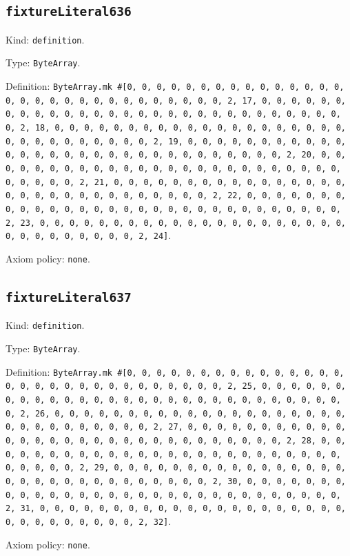 \documentclass[11pt]{article}
\begin{document}
\subsection*{\texttt{fixtureLiteral636}}
\noindent Kind: \texttt{definition}.\par
\noindent Type: \texttt{ByteArray}.\par
\noindent Definition: \texttt{ByteArray.mk \#[0, 0, 0, 0, 0, 0, 0, 0, 0, 0, 0, 0, 0, 0, 0, 0, 0, 0, 0, 0, 0, 0, 0, 0, 0, 0, 0, 0, 0, 0, 2, 17, 0, 0, 0, 0, 0, 0, 0, 0, 0, 0, 0, 0, 0, 0, 0, 0, 0, 0, 0, 0, 0, 0, 0, 0, 0, 0, 0, 0, 0, 0, 2, 18, 0, 0, 0, 0, 0, 0, 0, 0, 0, 0, 0, 0, 0, 0, 0, 0, 0, 0, 0, 0, 0, 0, 0, 0, 0, 0, 0, 0, 0, 0, 2, 19, 0, 0, 0, 0, 0, 0, 0, 0, 0, 0, 0, 0, 0, 0, 0, 0, 0, 0, 0, 0, 0, 0, 0, 0, 0, 0, 0, 0, 0, 0, 2, 20, 0, 0, 0, 0, 0, 0, 0, 0, 0, 0, 0, 0, 0, 0, 0, 0, 0, 0, 0, 0, 0, 0, 0, 0, 0, 0, 0, 0, 0, 0, 2, 21, 0, 0, 0, 0, 0, 0, 0, 0, 0, 0, 0, 0, 0, 0, 0, 0, 0, 0, 0, 0, 0, 0, 0, 0, 0, 0, 0, 0, 0, 0, 2, 22, 0, 0, 0, 0, 0, 0, 0, 0, 0, 0, 0, 0, 0, 0, 0, 0, 0, 0, 0, 0, 0, 0, 0, 0, 0, 0, 0, 0, 0, 0, 2, 23, 0, 0, 0, 0, 0, 0, 0, 0, 0, 0, 0, 0, 0, 0, 0, 0, 0, 0, 0, 0, 0, 0, 0, 0, 0, 0, 0, 0, 0, 0, 2, 24]}.\par
\noindent Axiom policy: \texttt{none}.\par
\subsection*{\texttt{fixtureLiteral637}}
\noindent Kind: \texttt{definition}.\par
\noindent Type: \texttt{ByteArray}.\par
\noindent Definition: \texttt{ByteArray.mk \#[0, 0, 0, 0, 0, 0, 0, 0, 0, 0, 0, 0, 0, 0, 0, 0, 0, 0, 0, 0, 0, 0, 0, 0, 0, 0, 0, 0, 0, 0, 2, 25, 0, 0, 0, 0, 0, 0, 0, 0, 0, 0, 0, 0, 0, 0, 0, 0, 0, 0, 0, 0, 0, 0, 0, 0, 0, 0, 0, 0, 0, 0, 2, 26, 0, 0, 0, 0, 0, 0, 0, 0, 0, 0, 0, 0, 0, 0, 0, 0, 0, 0, 0, 0, 0, 0, 0, 0, 0, 0, 0, 0, 0, 0, 2, 27, 0, 0, 0, 0, 0, 0, 0, 0, 0, 0, 0, 0, 0, 0, 0, 0, 0, 0, 0, 0, 0, 0, 0, 0, 0, 0, 0, 0, 0, 0, 2, 28, 0, 0, 0, 0, 0, 0, 0, 0, 0, 0, 0, 0, 0, 0, 0, 0, 0, 0, 0, 0, 0, 0, 0, 0, 0, 0, 0, 0, 0, 0, 2, 29, 0, 0, 0, 0, 0, 0, 0, 0, 0, 0, 0, 0, 0, 0, 0, 0, 0, 0, 0, 0, 0, 0, 0, 0, 0, 0, 0, 0, 0, 0, 2, 30, 0, 0, 0, 0, 0, 0, 0, 0, 0, 0, 0, 0, 0, 0, 0, 0, 0, 0, 0, 0, 0, 0, 0, 0, 0, 0, 0, 0, 0, 0, 2, 31, 0, 0, 0, 0, 0, 0, 0, 0, 0, 0, 0, 0, 0, 0, 0, 0, 0, 0, 0, 0, 0, 0, 0, 0, 0, 0, 0, 0, 0, 0, 2, 32]}.\par
\noindent Axiom policy: \texttt{none}.\par
\end{document}
